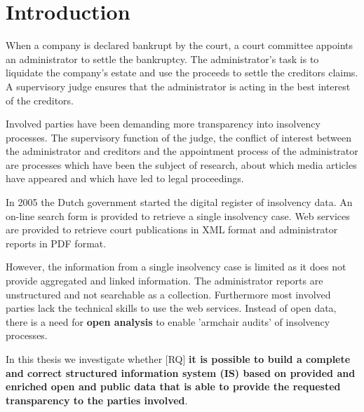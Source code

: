\section{Introduction}
When a company is declared bankrupt by the court, a court committee appoints an administrator to settle the bankruptcy. The administrator's task is to liquidate the company's estate and use the proceeds to settle the creditors claims. A supervisory judge ensures that the administrator is acting in the best interest of the creditors. 

Involved parties have been demanding more transparency into insolvency processes. The supervisory function of the judge, the conflict of interest between the administrator and creditors and the appointment process of the administrator are processes which have been the subject of research\cite{boluk_2011}, about which media articles have appeared \cite{dennis_meneer_2018:1, dennis_meneer_2017:1, jan-hein_strop_2015:1} and which have led to legal proceedings.   

\begin{comment}
Other benefits: Supervisory judges with significant work load could benefit from data driven supervision. Information access to the general public and journalists to this processes  would provide additional checks and balances.
\end{comment}

In 2005 the Dutch government started the digital register of insolvency data\cite{rechtspraak:cir}. An on-line search form \cite{rechtspraak:cir-zoeken} is provided to retrieve a single insolvency case. Web services are provided to retrieve court publications in XML format and administrator reports in PDF format. 

However, the information from a single insolvency case is limited as it does not provide aggregated and linked information. The administrator reports are unstructured and not searchable as a collection. Furthermore most involved parties lack the technical skills to use the web services. Instead of open data, there is a need for \textbf{open analysis} to enable 'armchair audits'\cite{o_leary_2015} of insolvency processes.

In this thesis we investigate whether [RQ] \textbf{it is possible to build a complete and correct structured information system (IS) based on provided and enriched open and public data that is able to provide the requested transparency to the parties involved}.

